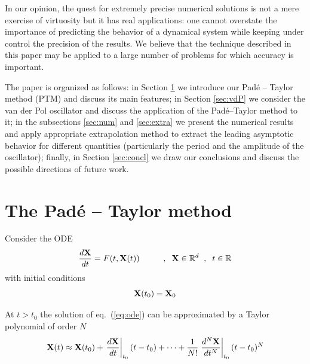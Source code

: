 \documentclass[final]{article}
\begin{document}
In our opinion, the quest for extremely precise numerical solutions is not a mere exercise of virtuosity but it has real  applications: one cannot overstate the importance of predicting the behavior of a dynamical system while keeping under control the precision of the results. We believe that the technique described in this paper may be applied to a large number of problems for which accuracy is important.

The paper is organized as follows: in Section \ref{sec:method} we introduce our Pad\'e -- Taylor method (PTM) and discuss its main features; in Section \ref{sec:vdP} we consider the van der Pol oscillator and discuss the application of the Pad\'e--Taylor method to it; 
in the subsections \ref{sec:num} and \ref{sec:extra} we present the numerical results and apply appropriate extrapolation method to extract the leading asymptotic behavior for different quantities (particularly the period and the amplitude of the oscillator); finally, in Section \ref{sec:concl} we draw our conclusions and  discuss the possible directions of future work.


\section{The Pad\'e -- Taylor method}
\label{sec:method}

Consider the ODE
\begin{equation}
\frac{d{\bf X}}{dt} = F(t, {\bf X}(t)) \hspace{1cm} , \hspace{.2cm} {\bf X} \in \mathbb{R}^d   \hspace{.2cm} , \hspace{.2cm} t \in \mathbb{R}
\label{eq:ode}
\end{equation}
with initial conditions
\begin{equation}
{\bf X}(t_0) = {\bf X}_0 
\end{equation}

At $t>t_0$ the solution of eq.~(\ref{eq:ode}) can be approximated by a Taylor polynomial of order $N$
\begin{equation}
{\bf X}(t) \approx {\bf X}(t_0) + \left. \frac{d{\bf X}}{dt} \right|_{t_0} (t-t_0) + \dots + 
\frac{1}{N!} \left. \frac{d^N{\bf X}}{dt^N} \right|_{t_0} (t-t_0)^N
\label{eq:Taylor}
\end{equation}
\end{document}
